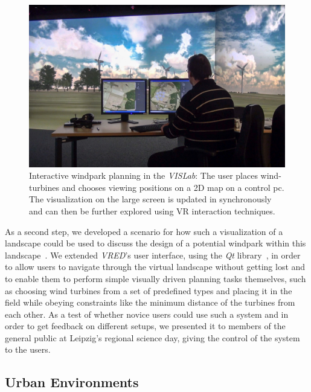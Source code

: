 \documentclass[twocolumn]{svjour3}          %
\begin{document}
\begin{figure}[htb]
  \includegraphics[width=\linewidth]{images/landscape.jpg}
  \caption{Interactive windpark planning in the \emph{VISLab}: The user places wind-turbines and chooses viewing positions on a 2D map on a control pc. The visualization on the large screen is updated in synchronously and can then be further explored using VR interaction techniques.}
\label{fig:landscape}
\end{figure}

As a second step, we developed a scenario for how such a visualization of a landscape could be used to discuss the design of a potential windpark within this landscape~\cite{zehner:windpark}. We extended \emph{VRED}'s user interface, using the \emph{Qt} library~\cite{web:qt}, in order to allow users to navigate through the virtual landscape without getting lost and to enable them to perform simple visually driven planning tasks themselves, such as choosing wind turbines from a set of predefined types and placing it in the field while obeying constraints like the minimum distance of the turbines from each other. As a test of whether novice users could use such a system and in order to get feedback on different setups, we presented it to members of the general public at Leipzig's regional science day, giving the control of the system to the users.

\subsection{Urban Environments}
\label{urban-environments}

\end{document}
